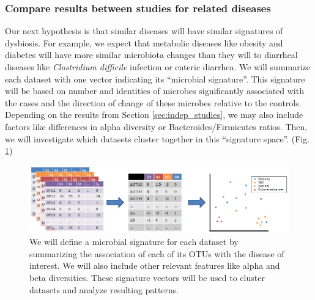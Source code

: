 \documentclass[12pt]{article}
\begin{document}
\subsubsection{Compare results between studies for related diseases}\label{sec:signatures}
Our next hypothesis is that similar diseases will have similar 
signatures of dysbiosis. For example, we expect that metabolic 
diseases like obesity and diabetes will have more similar microbiota 
changes than they will to diarrheal diseases like \textit{Clostridium 
difficile} infection or enteric diarrhea. We will summarize each 
dataset with one vector indicating its ``microbial signature''. This 
signature will be based on number and identities of microbes 
significantly associated with the cases and the direction of change 
of these microbes relative to the controls. Depending on the results from Section 
\ref{sec:indep_studies}, we may also include factors like differences 
in alpha diversity or Bacteroides/Firmicutes ratios. Then, we will 
investigate which datasets cluster together in this ``signature space''. 
(Fig. \ref{fig:microbe_signatures})

\begin{figure}
\begin{center}
\includegraphics[scale=0.6]{microbial_signatures}
\caption{We will define a microbial signature for each dataset by summarizing
the association of each of its OTUs with the disease of interest. We will
also include other relevant features like alpha and beta diversities. These 
signature vectors will be used to cluster datasets and analyze resulting patterns.}\label{fig:microbe_signatures}
\end{center}
\end{figure}
\end{document}
